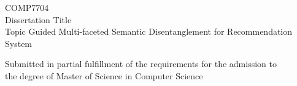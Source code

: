 \begin{titlepage}
\begin{center}

\vspace{30pt} %
\begin{center}
    {COMP7704}\\[10pt] %
    {Dissertation Title}\\ %
    {Topic Guided Multi-faceted Semantic Disentanglement for Recommendation System}\\[20pt] %
\end{center}

\vspace{40pt} %


\begin{center}
    {Submitted in partial fulfillment of the requirements for the admission to\\
    the degree of Master of Science in Computer Science}\\[20pt]
\end{center}


\end{center}
\end{titlepage}

